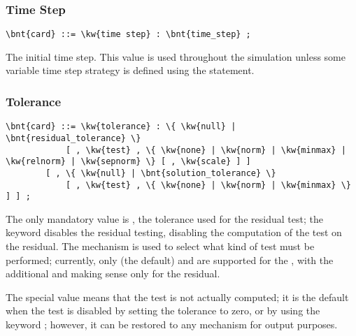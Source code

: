 \subsubsection{Time Step}
\begin{Verbatim}[commandchars=\\\{\}]
    \bnt{card} ::= \kw{time step} : \bnt{time_step} ;
\end{Verbatim}
The initial time step.
This value is used throughout the simulation unless some variable time step
strategy is defined using the  statement.

\subsubsection{Tolerance}\label{sec:IVP:TOLERANCE}
\begin{Verbatim}[commandchars=\\\{\}]
    \bnt{card} ::= \kw{tolerance} : \{ \kw{null} | \bnt{residual_tolerance} \}
            [ , \kw{test} , \{ \kw{none} | \kw{norm} | \kw{minmax} | \kw{relnorm} | \kw{sepnorm} \} [ , \kw{scale} ] ]
        [ , \{ \kw{null} | \bnt{solution_tolerance} \} 
            [ , \kw{test} , \{ \kw{none} | \kw{norm} | \kw{minmax} \} ] ] ;
\end{Verbatim}
The only mandatory value is , 
the tolerance used for the residual test; the keyword 
disables the residual testing, disabling the computation
of the test on the residual.
The  mechanism is used to select what kind of test must
be performed; currently, only  (the default) 
and  are supported for the , with
the additional  and  making sense only for the residual.

The special value  means that the test is not actually 
computed; it is the default when the test is disabled by setting
the tolerance to zero, or by using the keyword ;
however, it can be restored to any mechanism for output purposes.

